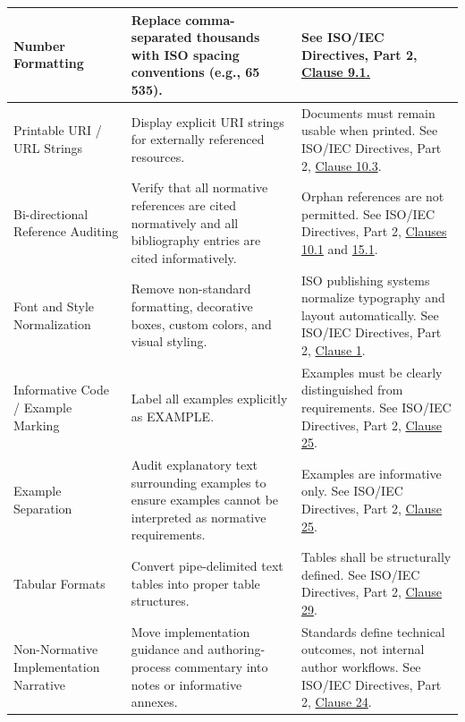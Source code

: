 \documentclass[11pt,a4paper]{article}
\begin{document}
\begin{table}[h]
\begin{tabular}{|l|l|l|}
Number Formatting & Replace comma-separated thousands with ISO spacing conventions (e.g., 65 535). & See ISO/IEC Directives, Part 2, \href{https://www.iso.org/sites/directives/current/part2/index.xhtml\#\_idTextAnchor005}{Clause 9.1.} \\ \hline
Printable URI / URL Strings & Display explicit URI strings for externally referenced resources. & Documents must remain usable when printed. See ISO/IEC Directives, Part 2, \href{https://www.iso.org/sites/directives/current/part2/index.xhtml\#\_idTextAnchor005}{Clause 10.3}. \\ \hline
Bi-directional Reference Auditing & Verify that all normative references are cited normatively and all bibliography entries are cited informatively. & Orphan references are not permitted. See ISO/IEC Directives, Part 2, \href{https://www.iso.org/sites/directives/current/part2/index.xhtml\#\_idTextAnchor005}{Clauses 10.1} and \href{https://www.iso.org/sites/directives/current/part2/index.xhtml\#\_idTextAnchor005}{15.1}. \\ \hline
Font and Style Normalization & Remove non-standard formatting, decorative boxes, custom colors, and visual styling. & ISO publishing systems normalize typography and layout automatically. See ISO/IEC Directives, Part 2, \href{https://www.iso.org/sites/directives/current/part2/index.xhtml\#\_idTextAnchor005}{Clause 1}. \\ \hline
Informative Code / Example Marking & Label all examples explicitly as EXAMPLE. & Examples must be clearly distinguished from requirements. See ISO/IEC Directives, Part 2, \href{https://www.iso.org/sites/directives/current/part2/index.xhtml\#\_idTextAnchor005}{Clause 25}. \\ \hline
Example Separation & Audit explanatory text surrounding examples to ensure examples cannot be interpreted as normative requirements. & Examples are informative only. See ISO/IEC Directives, Part 2, \href{https://www.iso.org/sites/directives/current/part2/index.xhtml\#\_idTextAnchor005}{Clause 25}. \\ \hline
Tabular Formats & Convert pipe-delimited text tables into proper table structures. & Tables shall be structurally defined. See ISO/IEC Directives, Part 2, \href{https://www.iso.org/sites/directives/current/part2/index.xhtml\#\_idTextAnchor005}{Clause 29}. \\ \hline
Non-Normative Implementation Narrative & Move implementation guidance and authoring-process commentary into notes or informative annexes. & Standards define technical outcomes, not internal author workflows. See ISO/IEC Directives, Part 2, \href{https://www.iso.org/sites/directives/current/part2/index.xhtml\#\_idTextAnchor005}{Clause 24}. \\ \hline

\end{tabular}
\end{table}
\end{document}
